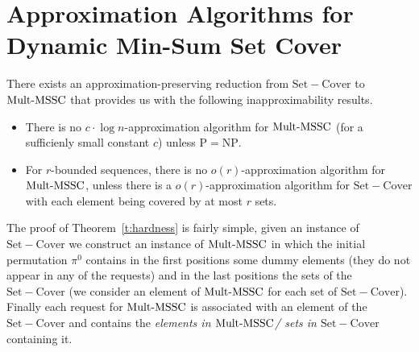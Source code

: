 \section{Approximation Algorithms for Dynamic Min-Sum Set Cover}\label{s:main}
\noindent There exists an
approximation-preserving reduction from $\mathrm{Set-Cover}$ to  
$\mathrm{Mult}\text{-}\mathrm{MSSC}$ that provides us with the following inapproximability results.
\begin{theorem}\label{t:hardness}
\begin{itemize}
    \item There is no $c \cdot \log n$-approximation algorithm for $\mathrm{Mult}\text{-}\mathrm{MSSC}$ (for a sufficienly small constant $c$) unless $\mathrm{P = NP}$.
    
    \item For $r$-bounded sequences, there is no $o(r)$-approximation algorithm for $\mathrm{Mult}\text{-}\mathrm{MSSC}$, unless there is a
    $o(r)$-approximation algorithm for $\mathrm{Set-Cover}$ with each element being covered by at most $r$ sets.
\end{itemize}
\end{theorem}

\noindent The proof of Theorem~\ref{t:hardness} is fairly simple, given an instance of $\mathrm{Set-Cover}$ we construct an instance of $\mathrm{Mult}\text{-}\mathrm{MSSC}$ in which the initial permutation $\pi^0$ contains in the first positions some dummy elements (they do not appear in any of the requests) and in the last positions the sets of the $\mathrm{Set-Cover}$ (we consider an element of $\mathrm{Mult}\text{-}\mathrm{MSSC}$ for each set of $\mathrm{Set-Cover}$). Finally each request for $\mathrm{Mult}\text{-}\mathrm{MSSC}$ is associated with an element of the $\mathrm{Set-Cover}$ and contains the \textit{elements in $\mathrm{Mult}\text{-}\mathrm{MSSC}$/ sets in $\mathrm{Set-Cover}$} containing it.

